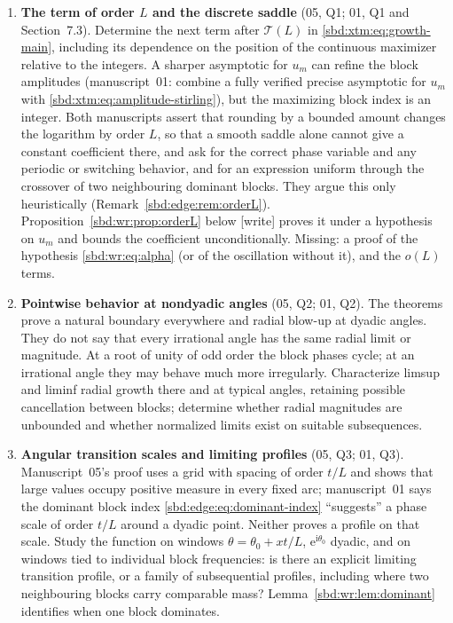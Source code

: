 \documentclass[11pt,a4paper]{article}
\theoremstyle{definition}
\newcommand{\e}{\mathrm e}
\newcommand{\ii}{\mathrm i}
\begin{document}
\begin{enumerate}[label=\textbf{\arabic*.},leftmargin=*]
\item \textbf{The term of order $L$ and the discrete saddle} (05, Q1; 01,
Q1 and Section~7.3). Determine the next term after $\mathcal T(L)$ in
\eqref{sbd:xtm:eq:growth-main}, including its dependence on the position of
the continuous maximizer relative to the integers. A sharper asymptotic for
$u_m$ can refine the block amplitudes (manuscript~01: combine a fully
verified precise asymptotic for $u_m$ with
\eqref{sbd:xtm:eq:amplitude-stirling}), but the maximizing block index is
an integer. Both manuscripts assert that rounding by a bounded amount
changes the logarithm by order $L$, so that a smooth saddle alone cannot
give a constant coefficient there, and ask for the correct phase variable
and any periodic or switching behavior, and for an expression uniform
through the crossover of two neighbouring dominant blocks. They argue this
only heuristically (Remark~\ref{sbd:edge:rem:orderL}).
Proposition~\ref{sbd:wr:prop:orderL} below [write] proves it under a
hypothesis on $u_m$ and bounds the coefficient unconditionally. Missing: a
proof of the hypothesis \eqref{sbd:wr:eq:alpha} (or of the oscillation
without it), and the $o(L)$ terms.

\item \textbf{Pointwise behavior at nondyadic angles} (05, Q2; 01, Q2). The
theorems prove a natural boundary everywhere and radial blow-up at dyadic
angles. They do not say that every irrational angle has the same radial
limit or magnitude. At a root of unity of odd order the block phases cycle;
at an irrational angle they may behave much more irregularly. Characterize
limsup and liminf radial growth there and at typical angles, retaining
possible cancellation between blocks; determine whether radial magnitudes
are unbounded and whether normalized limits exist on suitable subsequences.

\item \textbf{Angular transition scales and limiting profiles} (05, Q3; 01,
Q3). Manuscript~05's proof uses a grid with spacing of order $t/L$ and shows
that large values occupy positive measure in every fixed arc; manuscript~01
says the dominant block index \eqref{sbd:edge:eq:dominant-index}
``suggests'' a phase scale of order $t/L$ around a dyadic point. Neither
proves a profile on that scale. Study the function on windows
$\theta=\theta_0+xt/L$, $\e^{\ii\theta_0}$ dyadic, and on windows tied to
individual block frequencies: is there an explicit limiting transition
profile, or a family of subsequential profiles, including where two
neighbouring blocks carry comparable mass? Lemma~\ref{sbd:wr:lem:dominant}
identifies when one block dominates.


\end{enumerate}
\end{document}
